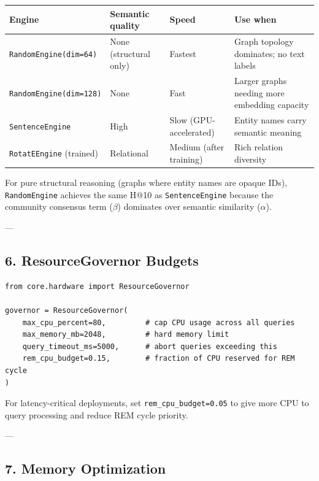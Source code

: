 \documentclass[11pt,article,oneside]{memoir}
\begin{document}
\begin{center}
{\footnotesize
\begin{tabularx}{\columnwidth}{|>{\raggedright\arraybackslash}X|>{\raggedright\arraybackslash}X|>{\raggedright\arraybackslash}X|>{\raggedright\arraybackslash}X|}
\hline
Engine & Semantic quality & Speed & Use when \\ \hline
\texttt{RandomEngine(dim=64)} & None (structural only) & Fastest & Graph topology dominates; no text labels \\ \hline
\texttt{RandomEngine(dim=128)} & None & Fast & Larger graphs needing more embedding capacity \\ \hline
\texttt{SentenceEngine} & High & Slow (GPU-accelerated) & Entity names carry semantic meaning \\ \hline
\texttt{RotatEEngine} (trained) & Relational & Medium (after training) & Rich relation diversity \\ \hline
\end{tabularx}
}
\end{center}

For pure structural reasoning (graphs where entity names are opaque IDs), \texttt{RandomEngine} achieves the same H@10 as \texttt{SentenceEngine} because the community consensus term ($\beta$) dominates over semantic similarity ($\alpha$).

---

\subsection{6. ResourceGovernor Budgets}

\begin{lstlisting}
from core.hardware import ResourceGovernor

governor = ResourceGovernor(
    max_cpu_percent=80,         # cap CPU usage across all queries
    max_memory_mb=2048,         # hard memory limit
    query_timeout_ms=5000,      # abort queries exceeding this
    rem_cpu_budget=0.15,        # fraction of CPU reserved for REM cycle
)
\end{lstlisting}

For latency-critical deployments, set \texttt{rem\_cpu\_budget=0.05} to give more CPU to query processing and reduce REM cycle priority.

---

\subsection{7. Memory Optimi\-zation}
\end{document}
